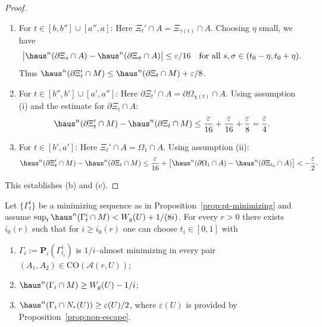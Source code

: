 \begin{proof}
\begin{enumerate}[label=(\roman*)]
\item For $t\in[b,b'']\cup[a'',a]$: Here $\Xi_t'\cap A=\Xi_{\gamma(t)}\cap A$. Choosing $\eta$ small, we have
\[
\bigl|\haus^n(\partial\Xi_s\cap A)-\haus^n(\partial\Xi_\sigma\cap A)\bigr|\le \varepsilon/16
\quad\text{for all }s,\sigma\in(t_0-\eta,t_0+\eta).
\]
Thus $\haus^n(\partial\Xi_t'\cap M)\le \haus^n(\partial\Xi_t\cap M)+\varepsilon/8$.

\item For $t\in[b'',b']\cup[a',a'']$: Here $\partial\Xi_t'\cap A=\partial\Omega_{\chi(t)}\cap A$. Using assumption (i) and the estimate for $\partial\Xi_t\cap A$:
\[
\haus^n(\partial\Xi_t'\cap M)-\haus^n(\partial\Xi_t\cap M)
\le \frac{\varepsilon}{16}+\frac{\varepsilon}{16}+\frac{\varepsilon}{8}=\frac{\varepsilon}{4}.
\]

\item For $t\in[b',a']$: Here $\Xi_t'\cap A=\Omega_1\cap A$. Using assumption (ii):
\[
\haus^n(\partial\Xi_t'\cap M)-\haus^n(\partial\Xi_t\cap M)
\le \frac{\varepsilon}{16}+\bigl[\haus^n(\partial\Omega_1\cap A)-\haus^n(\partial\Xi_{t_0}\cap A)\bigr]
<-\frac{\varepsilon}{2}.
\]
\end{enumerate}
This establishes (b) and (c).
\end{proof}

\begin{proposition}\label{prop:AM-selection}
Let $\{\Gamma_t^i\}$ be a minimizing sequence as in Proposition~\ref{prop:pt-minimizing} and assume $\sup_{t}\haus^n(\Gamma_t^i\cap M)<W_g(U)+1/(8i)$.  For every $r>0$ there exists $i_0(r)$ such that for $i\ge i_0(r)$ one can choose $t_i\in[0,1]$ with
\begin{enumerate}
    \item $\Gamma_i:=\mathbf{P}_i(\Gamma_{t_i}^i)$ is $1/i$--almost minimizing in every pair $(A_1,A_2)\in\mathrm{CO}(\mathcal{A}(r,U))$;
    \item $\haus^n(\Gamma_i\cap M)\ge W_g(U)-1/i$;
    \item $\haus^n(\Gamma_i\cap N_r(U))\ge \varepsilon(U)/2$, where $\varepsilon(U)$ is provided by Proposition~\ref{prop:non-escape}.
\end{enumerate}
\end{proposition}

